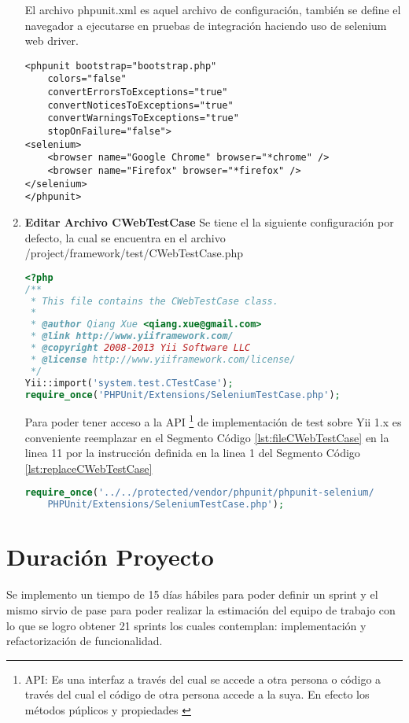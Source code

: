 \begin{enumerate}
El archivo phpunit.xml es aquel archivo de configuraci\'{o}n, tambi\'{e}n se 
define el navegador a ejecutarse en pruebas de integraci\'{o}n haciendo uso
de selenium web driver.

\begin{lstlisting}[]
<phpunit bootstrap="bootstrap.php"
	colors="false"
    convertErrorsToExceptions="true"
    convertNoticesToExceptions="true"
    convertWarningsToExceptions="true"
  	stopOnFailure="false">
<selenium>
	<browser name="Google Chrome" browser="*chrome" />
    <browser name="Firefox" browser="*firefox" />
</selenium>
</phpunit>
\end{lstlisting}

\item \textbf{Editar Archivo CWebTestCase}
Se tiene el la siguiente configuraci\'{o}n por defecto, la cual se encuentra en
el archivo /project/framework/test/CWebTestCase.php

\begin{lstlisting}[language=PHP, caption={Cabecera Archivo CWebTestCase}, label={lst:fileCWebTestCase}]
<?php
/**
 * This file contains the CWebTestCase class.
 *
 * @author Qiang Xue <qiang.xue@gmail.com>
 * @link http://www.yiiframework.com/
 * @copyright 2008-2013 Yii Software LLC
 * @license http://www.yiiframework.com/license/
 */
Yii::import('system.test.CTestCase');
require_once('PHPUnit/Extensions/SeleniumTestCase.php');
\end{lstlisting}

Para poder tener acceso a la API \footnote{API: Es una interfaz a trav\'{e}s 
del cual se accede a otra persona o c\'{o}digo a trav\'{e}s del cual el 
c\'{o}digo de otra persona accede a la suya. En efecto los m\'{e}todos 
p\'{u}plicos y propiedades \cite{api}} de implementaci\'{o}n de test sobre Yii
1.x es conveniente reemplazar en el Segmento C\'{o}digo 
\ref{lst:fileCWebTestCase} en la linea 11 por la instrucci\'{o}n definida en la
linea 1 del Segmento C\'{o}digo \ref{lst:replaceCWebTestCase}

\begin{lstlisting}[language=PHP, caption={Instrucci\'{o}n a Reemplazar}, label={lst:replaceCWebTestCase}]
require_once('../../protected/vendor/phpunit/phpunit-selenium/
	PHPUnit/Extensions/SeleniumTestCase.php');
\end{lstlisting}

\end{enumerate}

\section{Duraci\'{o}n Proyecto}

Se implemento un tiempo de 15 d\'{i}as h\'{a}biles para poder definir un sprint y
el mismo sirvio de pase para poder realizar la estimaci\'{o}n del equipo de 
trabajo con lo que se logro obtener 21 sprints los cuales contemplan: 
implementaci\'{o}n y refactorizaci\'{o}n de funcionalidad.